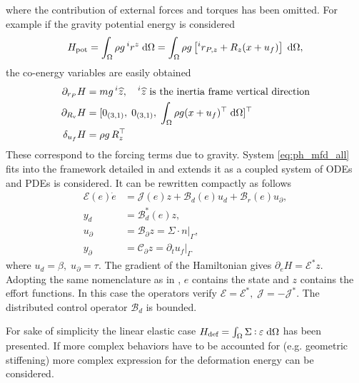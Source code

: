 where the contribution of external forces and torques has been omitted. For example if the gravity potential energy is considered
\begin{equation*}
	H_{\text{pot}} = \int_{\Omega} \rho g \, ^i r^z \d{\Omega} = \int_{\Omega} \rho g \left[ ^i r_{P, z} +R_z (x + u_f) \right] \d{\Omega},
\end{equation*}
the co-energy variables are easily obtained
\begin{align*}
\partial_{r_P}H &= m g \, ^i \widehat{z}, \quad \text{$^i \widehat{z}$ is the inertia frame vertical direction}\\
\partial_{R_\text{v}}H &= [0_{(3, 1)}, \; 0_{(3, 1)}, \; \int_{\Omega} \rho g (x + u_f)^\top \d{\Omega}]^\top \\
\delta_{u_f} H &= \rho g \, R_z^\top
\end{align*}
These correspond to the forcing terms due to gravity. System \eqref{eq:ph_mfd_all} fits into the framework detailed in \cite{mehrmann2019structurepreserving} and extends it as a coupled system of ODEs and PDEs is considered. It can be rewritten compactly as follows
\begin{equation}
\label{eq:MFD_pHDAE}
\begin{aligned}
\mathcal{E}(e) \dot{e} &= \mathcal{J}(e) z + \mathcal{B}_d(e) u_d + \mathcal{B}_r(e) u_\partial, \\
y_d &= \mathcal{B}_d^*(e) z, \\
u_\partial &= \mathcal{B}_{\partial} z =  \Sigma \cdot n|_{\Gamma}, \\
y_\partial &= \mathcal{C}_{\partial} z = \partial_t u_f|_{\Gamma}
\end{aligned}
\end{equation}
where $u_d = \beta, \; u_\partial = \tau$. The gradient of the Hamiltonian  gives $\partial_e H = \mathcal{E}^* z$. Adopting the same nomenclature as in \cite{mehrmann2019structurepreserving}, $e$ contains the state and $z$ contains the effort functions. In this case the operators verify $\mathcal{E} = \mathcal{E}^*, \; \mathcal{J} = -\mathcal{J}^*$. The distributed control operator $\mathcal{B}_d$ is bounded. 

\begin{remark}
For sake of simplicity the linear elastic case $H_{\text{def}}=\int_{\Omega} \Sigma \cddot \varepsilon \d{\Omega}$ has been presented. If more complex behaviors have to be accounted for (e.g. geometric stiffening) more complex expression for the deformation energy can be considered.
\end{remark}

